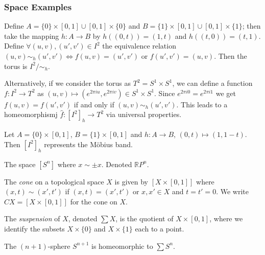 \subsubsection{Space Examples}\label{examplespaces}

\label{torus}
Define $A = \{ 0 \} \times [0,1] \cup [0,1] \times \{ 0 \}$ and $B = \{ 1 \} \times [0,1] \cup [0,1] \times \{ 1 \}$; then take the mapping
$h : A \rightarrow B$ by $h((0,t)) = (1,t)$ and $h((t,0)) = (t,1)$. Define $\forall (u,v),(u',v') \in I^2$ the equivalence relation
$(u,v) \sim_h (u',v') \Leftrightarrow f(u,v) = (u',v') \textrm { or } f(u',v') = (u,v).$ Then the torus is $I^2 / \sim_h$. \newline

\noindent Alternatively, if we consider the torus as $T^2 = S^1 \times S^1$, we can define a function $f : I^2 \rightarrow T^2$ as
$(u,v) \mapsto (e^{2 \pi i u}, e^{2 \pi i v}) \in S^1 \times S^1$. Since $e^{2 \pi i 0} = e^{2 \pi i 1}$ we get $f(u,v) = f(u',v')$ if and only
if $(u,v) \sim_h (u',v')$. This leads to a homeomorphismj $\hat{f} : [I^2]_h \rightarrow T^2$ via universal properties.

\label{mobiusstrip}
Let $A = \{ 0 \} \times [0,1]$, $B = \{ 1 \} \times [0,1]$ and $h : A \rightarrow B$, $(0,t) \mapsto (1,1-t)$. Then $[I^2]_h$ represents the M\"obius band.

\label{projectivespace}
The space $[S^n]$ where $x \sim \pm x$. Denoted $\mathbb{R}P^n$.

\label{cone}
The \emph{cone} on a topological space $X$ is given by $[X \times [0,1]]$ where $(x,t) \sim (x',t')$ if $(x,t) = (x',t')$ or
$x,x' \in X$ and $t = t' = 0$. We write $CX = [X \times [0,1]]$ for the cone on $X$.

\label{suspension}
The \emph{suspension} of $X$, denoted $\sum X$, is the quotient of $X \times [0,1]$, where we identify the subsets $X \times \{ 0 \}$ and $X \times \{ 1 \}$
each to a point.

\begin{proposition}
The $(n+1)$-sphere $S^{n+1}$ is homeomorphic to $\sum S^n$.
\end{proposition}

